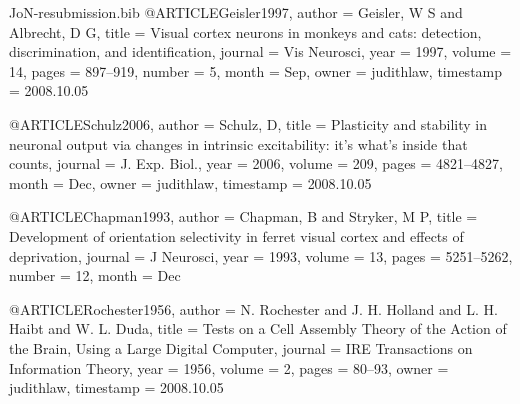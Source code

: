 \documentclass{article}
\begin{document}
\begin{filecontents}{JoN-resubmission.bib}
@ARTICLE{Geisler1997,
  author = {Geisler, W S and Albrecht, D G},
  title = {{{V}isual cortex neurons in monkeys and cats: detection, discrimination,
	and identification}},
  journal = {Vis Neurosci},
  year = {1997},
  volume = {14},
  pages = {897--919},
  number = {5},
  month = {Sep},
  owner = {judithlaw},
  timestamp = {2008.10.05}
}

@ARTICLE{Schulz2006,
  author = {Schulz, D},
  title = {{{P}lasticity and stability in neuronal output via changes in intrinsic
	excitability: it's what's inside that counts}},
  journal = {J. Exp. Biol.},
  year = {2006},
  volume = {209},
  pages = {4821--4827},
  month = {Dec},
  owner = {judithlaw},
  timestamp = {2008.10.05}
}

@ARTICLE{Chapman1993,
  author = {Chapman, B and Stryker, M P},
  title = {{Development of orientation selectivity in ferret visual cortex and
	effects of deprivation}},
  journal = {J Neurosci},
  year = {1993},
  volume = {13},
  pages = {5251--5262},
  number = {12},
  month = {Dec}
}

@ARTICLE{Rochester1956,
  author = {N. Rochester and J. H. Holland and L. H. Haibt and W. L. Duda},
  title = {Tests on a Cell Assembly Theory of the Action of the Brain, Using
	a Large Digital Computer},
  journal = {IRE Transactions on Information Theory},
  year = {1956},
  volume = {2},
  pages = {80--93},
  owner = {judithlaw},
  timestamp = {2008.10.05}
}


\end{filecontents}
\end{document}
